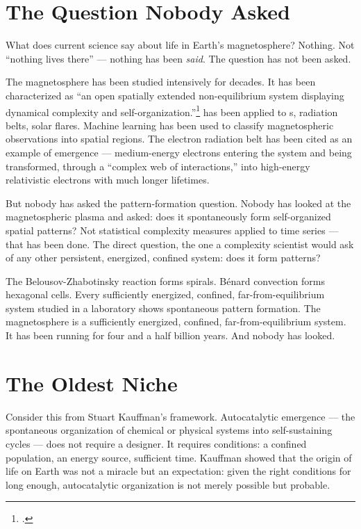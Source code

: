\section*{The Question Nobody Asked}
\label{spine:ws-the-question-nobody-asked}

What does current science say about life in Earth's magnetosphere? Nothing. Not ``nothing lives there'' --- nothing has been \textit{said}. The question has not been asked.

The magnetosphere has been studied intensively for decades. It has been characterized as ``an open spatially extended non-equilibrium system displaying dynamical complexity and self-organization.''\footcite{sharma2005}  has been applied to s, radiation belts, solar flares. Machine learning has been used to classify magnetospheric observations into spatial regions. The electron radiation belt has been cited as an example of emergence --- medium-energy electrons entering the system and being transformed, through a ``complex web of interactions,'' into high-energy relativistic electrons with much longer lifetimes.

But nobody has asked the pattern-formation question. Nobody has looked at the magnetospheric plasma and asked: does it spontaneously form self-organized spatial patterns? Not statistical complexity measures applied to time series --- that has been done. The direct question, the one a complexity scientist would ask of any other persistent, energized, confined system: does it form patterns?

The Belousov-Zhabotinsky reaction forms spirals. Bénard convection forms hexagonal cells. Every sufficiently energized, confined, far-from-equilibrium system studied in a laboratory shows spontaneous pattern formation. The magnetosphere is a sufficiently energized, confined, far-from-equilibrium system. It has been running for four and a half billion years. And nobody has looked.

\section*{The Oldest Niche}
\label{spine:ws-the-oldest-niche}

Consider this from Stuart Kauffman's framework. Autocatalytic emergence --- the spontaneous organization of chemical or physical systems into self-sustaining cycles --- does not require a designer. It requires conditions: a confined population, an energy source, sufficient time. Kauffman showed that the origin of life on Earth was not a miracle but an expectation: given the right conditions for long enough, autocatalytic organization is not merely possible but probable.

